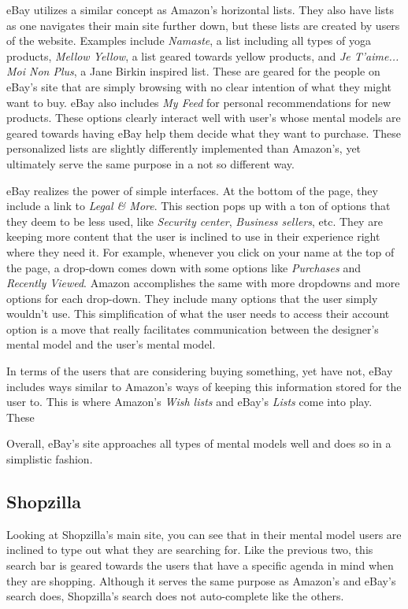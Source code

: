 \documentclass[11pt, oneside]{article}
\begin{document}
	eBay utilizes a similar concept as Amazon's horizontal lists. They also have lists as one navigates their main site further down, but these lists are created by users of the website. Examples include \textit{Namaste}, a list including all types of yoga products, \textit{Mellow Yellow}, a list geared towards yellow products, and \textit{Je T'aime... Moi Non Plus}, a Jane Birkin inspired list. These are geared for the people on eBay's site that are simply browsing with no clear intention of what they might want to buy. eBay also includes \textit{My Feed} for personal recommendations for new products. These options clearly interact well with user's whose mental models are geared towards having eBay help them decide what they want to purchase. These personalized lists are slightly differently implemented than Amazon's, yet ultimately serve the same purpose in a not so different way.

	eBay realizes the power of simple interfaces. At the bottom of the page, they include a link to \textit{Legal \& More}. This section pops up with a ton of options that they deem to be less used, like \textit{Security center}, \textit{Business sellers}, etc. They are keeping more content that the user is inclined to use in their experience right where they need it. For example, whenever you click on your name at the top of the page, a drop-down comes down with some options like \textit{Purchases} and \textit{Recently Viewed}. Amazon accomplishes the same with more dropdowns and more options for each drop-down. They include many options that the user simply wouldn't use. This simplification of what the user needs to access their account option is a move that really facilitates communication between the designer's mental model and the user's mental model.

	In terms of the users that are considering buying something, yet have not, eBay includes ways similar to Amazon's ways of keeping this information stored for the user to. This is where Amazon's \textit{Wish lists} and eBay's \textit{Lists} come into play. These 

	Overall, eBay's site approaches all types of mental models well and does so in a simplistic fashion.

	\subsection{Shopzilla}

	Looking at Shopzilla's main site, you can see that in their mental model users are inclined to type out what they are searching for. Like the previous two, this search bar is geared towards the users that have a specific agenda in mind when they are shopping. Although it serves the same purpose as Amazon's and eBay's search does, Shopzilla's search does not auto-complete like the others.
\end{document}
